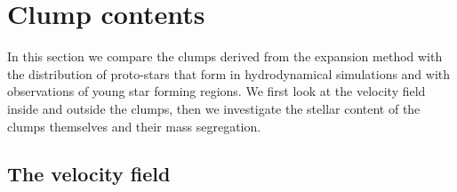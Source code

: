 \section{Clump contents}

In this section we compare the clumps derived from the \HubLem expansion method with the distribution of proto-stars that form in hydrodynamical simulations and with observations of young star forming regions. We first look at the velocity field inside and outside the clumps, then we investigate the stellar content of the clumps themselves and their mass segregation.


\subsection{The velocity field}
\label{sec:velocityfield} 




